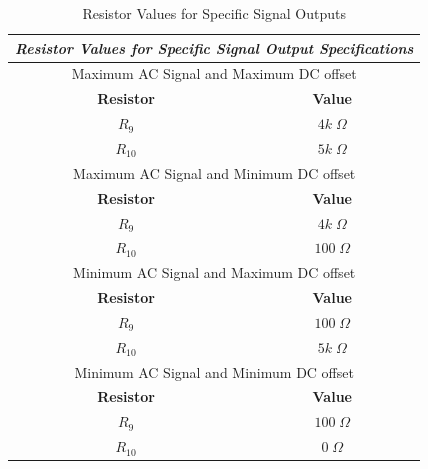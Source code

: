 \documentclass[12pt]{report}
\begin{document}
\begin{table}[!htpb]
\begin{center}
\begin{tabular}{*2c}
\toprule 
  \multicolumn{2}{c}{\textbf{\textit{Resistor Values for Specific Signal Output Specifications}}} \\ 
  \midrule
  \multicolumn{2}{c}{Maximum AC Signal and Maximum DC offset}\\ 
  \midrule
  \textbf{Resistor} & \textbf{Value} \\  
  
  $R_9$ & $4k\;\Omega$\\  
  
  $R_{10}$ & $5k\;\Omega$\\  
  \midrule
  \multicolumn{2}{c}{Maximum AC Signal and Minimum DC offset}\\ 
  \midrule
  \textbf{Resistor} & \textbf{Value} \\  
  
  $R_9$ & $4k\;\Omega$\\  
  
  $R_{10}$ & $100\;\Omega$\\  
  \midrule
  \multicolumn{2}{c}{Minimum AC Signal and Maximum DC offset}\\ 
  \midrule
  \textbf{Resistor} & \textbf{Value} \\  
  
  $R_9$ & $100\;\Omega$\\ 
  
  $R_{10}$ & $5k\;\Omega$\\ 
  \midrule
  \multicolumn{2}{c}{Minimum AC Signal and Minimum DC offset}\\ 
  \midrule
  \textbf{Resistor} & \textbf{Value} \\  
  
  $R_9$ & $100\;\Omega$\\  
  
  $R_{10}$ & $0\;\Omega$\\   
  \bottomrule
\end{tabular}
\caption{Resistor Values for Specific Signal Outputs}
\label{table1}
\end{center}
\end{table}
\end{document}
